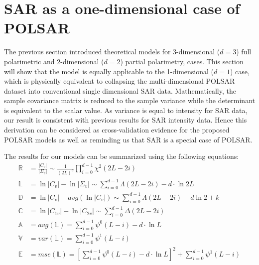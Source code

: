\documentclass[journal]{IEEEtran}
\begin{document}
\section{SAR as a one-dimensional case of POLSAR}
\label{sec:sar_special_case_of_polsar}

The previous section  introduced  theoretical models for 3-dimensional ($d=3$) full polarimetric and 2-dimensional ($d=2$) partial polarimetry, cases.
This section will show that the model is equally  applicable to the 1-dimensional ($d=1$) case,
  which is physically equivalent to  collapsing the multi-dimensional POLSAR dataset  into conventional single dimensional SAR data.
Mathematically, the sample covariance matrix is reduced to the sample variance while the determinant is equivalent to  the scalar value.
As variance is equal to intensity for SAR data, our result is consistent with previous results for SAR intensity data.
Hence this derivation can be considered as cross-validation evidence for the proposed POLSAR models
  as well as reminding us that SAR is a special case of POLSAR.
  
The results for our models can be summarized using the following equations:
\begin{align}
  \mathbb{R} &= \frac{|C_v|}{|\Sigma_v|} \sim \frac{1}{(2L)^d} \prod^{d-1}_{i=0} \chi^2(2L-2i) \\%
  \mathbb{L} &= \ln{|C_v|} - \ln{|\Sigma_v|} \sim \sum^{d-1}_{i=0} \Lambda(2L-2i) - d \cdot \ln{2L} \\ %
  \mathbb{D} &= \ln{|C_v|} - avg(\ln{|C_v|}) \sim \sum^{d-1}_{i=0} \Lambda(2L-2i) - d \ln{2} + k\\
  \mathbb{C} &= \ln{|C_{1v}|} - \ln{|C_{2v}|} \sim \sum^{d-1}_{i=0} \Delta(2L-2i) \\
  \mathbb{A} &= avg(\mathbb{L}) = \sum^{d-1}_{i=0} \psi^0(L-i) - d \cdot \ln{L} \\ %
  \mathbb{V} &= var(\mathbb{L}) = \sum^{d-1}_{i=0} \psi^1(L-i) \\ %
  \mathbb{E} &= mse(\mathbb{L}) =\left[ \sum^{d-1}_{i=0} \psi^0(L-i) - d \cdot \ln{L} \right]^2 +  \sum^{d-1}_{i=0} \psi^1(L-i) \label{eqn:polsar_dispersion_mse} 
\end{align}
\end{document}
